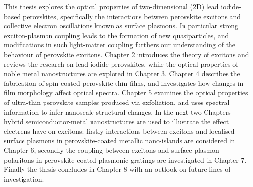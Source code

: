 This thesis explores the optical properties of two-dimensional (2D) lead iodide-based perovskites, specifically the interactions between perovskite excitons and collective electron oscillations known as surface plasmons. In particular strong exciton-plasmon coupling leads to the formation of new quasiparticles, and modifications in such light-matter coupling furthers our understanding of the behaviour of perovskite excitons. Chapter 2 introduces the theory of excitons and reviews the research on lead iodide perovskites, while the optical properties of noble metal nanostructures are explored in Chapter 3. Chapter 4 describes the fabrication of spin coated perovskite thin films, and investigates how changes in film morphology affect optical spectra. Chapter 5 examines the optical properties of ultra-thin perovskite samples produced via exfoliation, and uses spectral information to infer nanoscale structural changes. In the next two Chapters hybrid semiconductor-metal nanostructures are used to illustrate the effect electrons have on excitons: firstly interactions between excitons and localised surface plasmons in perovskite-coated metallic nano-islands are considered in Chapter 6, secondly the coupling between excitons and surface plasmon polaritons in perovskite-coated plasmonic gratings are investigated in Chapter 7. Finally the thesis concludes in Chapter 8 with an outlook on future lines of investigation.